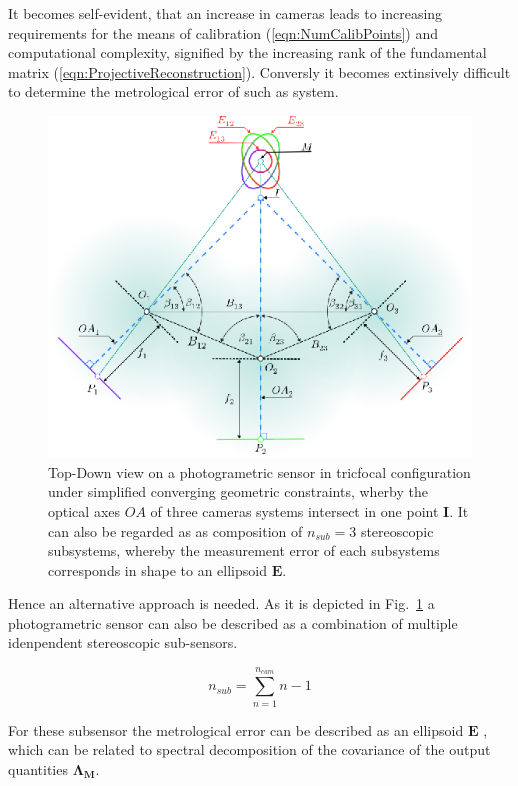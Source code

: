 \documentclass[5p,times,procedia]{elsarticle}
\begin{document}
It becomes self-evident, that an increase in cameras leads to increasing requirements for the means of calibration (\ref{eqn:NumCalibPoints}) and computational complexity, signified by the increasing rank of the fundamental matrix (\ref{eqn:ProjectiveReconstruction}). Conversly it becomes extinsively difficult to determine the metrological error 
of such as system.\\

\begin{figure}[h]
	\centering
	\includegraphics[width=0.8\linewidth]{graphics/MixedErrorCuttingGeometry.eps}
	\caption{Top-Down view on a photogrametric sensor in tricfocal configuration under simplified converging geometric constraints, wherby the optical axes $OA$ of three cameras systems intersect in one point $\mathbf{I}$.		
	It can also be regarded as as composition of $n_{sub}=3$ stereoscopic subsystems, whereby the measurement error of each subsystems corresponds in shape to an ellipsoid $\mathbf{E}$.}
	\label{fig:sub_sensors}
\end{figure}

Hence an alternative approach is needed. As it is depicted in  Fig.~\ref{fig:sub_sensors} a photogrametric sensor can also be described as a combination of multiple idenpendent stereoscopic sub-sensors.

\begin{equation}
	\label{eqn:CovarianceMatrix}
	n_{sub} = \sum_{n=1}^{n_{cam}}n-1
\end{equation}

For these subsensor the metrological error can be described as an ellipsoid $\mathbf{E}$ \cite{Luhmann2003}, which can be related to spectral decomposition of the covariance of the output quantities $\mathbf{\Lambda_{M}}$.
\end{document}
